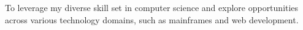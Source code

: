 

\begin{cvparagraph}

To leverage my diverse skill set in computer science and explore opportunities across various technology domains, such as mainframes and web development.
\end{cvparagraph}
